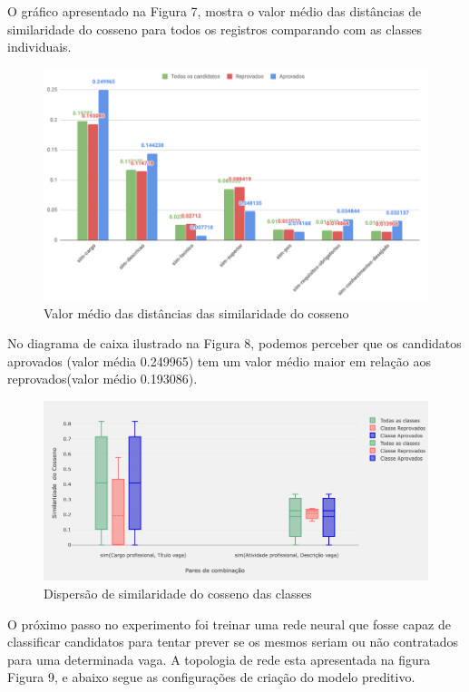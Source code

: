 \documentclass[conference]{IEEEtran}
\begin{document}
O gráfico apresentado na Figura 7, mostra o valor médio das distâncias  de similaridade do cosseno para todos os registros comparando com as classes individuais.
      \begin{figure}
    \centering
    \includegraphics[scale=0.5]{imagens/barras.png}
    \caption{Valor médio das distâncias das similaridade do cosseno}
    \label{barras}
  	\end{figure} 

 No diagrama de caixa ilustrado na Figura 8, podemos perceber que os candidatos aprovados (valor média 0.249965) tem um valor médio maior em relação aos reprovados(valor médio 0.193086). 
  \begin{figure}
    \centering
    \includegraphics[scale=0.5]{imagens/grafico_dispersao.png}
    \caption{Dispersão de similaridade do cosseno das classes}
    \label{dispersao}
  \end{figure} 

O próximo passo no experimento foi treinar uma rede neural que fosse capaz de classificar candidatos para tentar prever se os mesmos seriam ou não contratados para uma determinada vaga.
    A topologia de rede esta apresentada na figura Figura 9, e abaixo segue as configurações de criação do modelo preditivo. 
    
\end{document}
